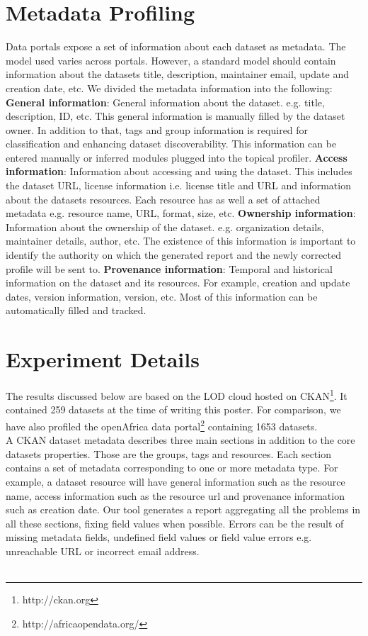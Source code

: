 \documentclass{sig-alternate}
\begin{document}
\section{Metadata Profiling}

Data portals expose a set of information about each dataset as metadata. The model used varies across portals. However, a standard model should contain information about the datasets title, description, maintainer email, update and creation date, etc. We divided the metadata information into the following:
\textbf{General information}: General information about the dataset. e.g. title, description, ID, etc. This general information is manually filled by the dataset owner. In addition to that, tags and group information is required for classification and enhancing dataset discoverability. This information can be entered manually or inferred modules plugged into the topical profiler.
\textbf{Access information}: Information about accessing and using the dataset. This includes the dataset URL, license information i.e. license title and URL and information about the datasets resources. Each resource has as well a set of attached metadata e.g. resource name, URL, format, size, etc.
\textbf{Ownership information}: Information about the ownership of the dataset. e.g. organization details, maintainer details, author, etc. The existence of this information is important to identify the authority on which the generated report and the newly corrected profile will be sent to.
\textbf{Provenance information}: Temporal and historical information on the dataset and its resources. For example, creation and update dates, version information, version, etc. Most of this information can be automatically filled and tracked.

\section{Experiment Details}
The results discussed below are based on the LOD cloud hosted on CKAN\footnote{http://ckan.org}. It contained 259 datasets at the time of writing this poster. For comparison, we have also profiled the openAfrica data portal\footnote{http://africaopendata.org/} containing 1653 datasets.\\
A CKAN dataset metadata describes three main sections in addition to the core datasets properties. Those are the groups, tags and resources. Each section contains a set of metadata corresponding to one or more metadata type. For example, a dataset resource will have general information such as the resource name, access information such as the resource url and provenance information such as creation date. Our tool generates a report aggregating all the problems in all these sections, fixing field values when possible. Errors can be the result of missing metadata fields, undefined field values or field value errors e.g. unreachable URL or incorrect email address.\\\\
\end{document}

